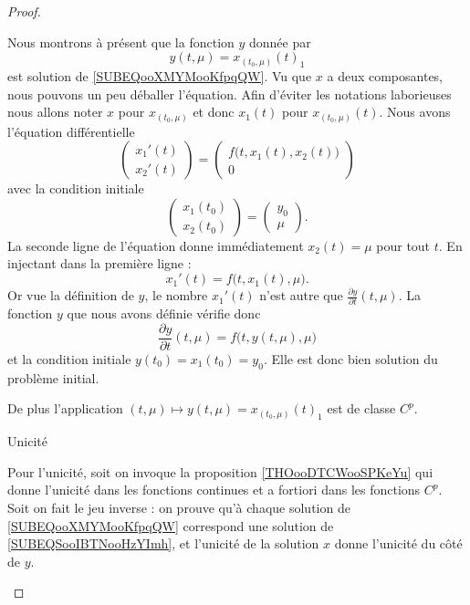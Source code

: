 \begin{proof}
\begin{subproof}
    Nous montrons à présent que la fonction \( y\) donnée par
    \begin{equation}
        y(t,\mu)=x_{(t_0,\mu)}(t)_1
    \end{equation}
    est solution de \eqref{SUBEQooXMYMooKfpqQW}. Vu que \( x\) a deux composantes, nous pouvons un peu déballer l'équation. Afin d'éviter les notations laborieuses nous allons noter \( x\) pour \( x_{(t_0,\mu)}\) et donc \( x_1(t)\) pour \( x_{(t_0,\mu)}(t)\). Nous avons l'équation différentielle
    \begin{equation}
        \begin{pmatrix}
            x_1'(t)    \\ 
            x_2'(t)    
        \end{pmatrix}=\begin{pmatrix}
            f\big( t,x_1(t),x_2(t) \big)    \\ 
            0    
        \end{pmatrix}
    \end{equation}
    avec la condition initiale
    \begin{equation}
        \begin{pmatrix}
            x_1(t_0)    \\ 
            x_2(t_0)    
        \end{pmatrix}=\begin{pmatrix}
            y_0    \\ 
            \mu    
        \end{pmatrix}.
    \end{equation}
    La seconde ligne de l'équation donne immédiatement \( x_2(t)=\mu\) pour tout \( t\). En injectant dans la première ligne :
    \begin{equation}
        x_1'(t)=f\big( t,x_1(t),\mu \big).
    \end{equation}
    Or vue la définition de \( y\), le nombre \( x_1'(t)\) n'est autre que \( \frac{ \partial y }{ \partial t }(t,\mu)\). La fonction \( y\) que nous avons définie vérifie donc
    \begin{equation}
        \frac{ \partial y }{ \partial t }(t,\mu)=f\big( t,y(t,\mu),\mu \big)
    \end{equation}
    et la condition initiale \( y(t_0)=x_1(t_0)=y_0\). Elle est donc bien solution du problème initial.

    De plus l'application \( (t,\mu)\mapsto y(t,\mu)=x_{(t_0,\mu)}(t)_1\) est de classe \( C^p\).
    
    \item[Unicité]

        Pour l'unicité, soit on invoque la proposition \ref{THOooDTCWooSPKeYu} qui donne l'unicité dans les fonctions continues et a fortiori dans les fonctions \( C^p\). Soit on fait le jeu inverse : on prouve qu'à chaque solution de \eqref{SUBEQooXMYMooKfpqQW} correspond une solution de \eqref{SUBEQSooIBTNooHzYImh}, et l'unicité de la solution \( x\) donne l'unicité du côté de \( y\).
    \end{subproof}
\end{proof}

